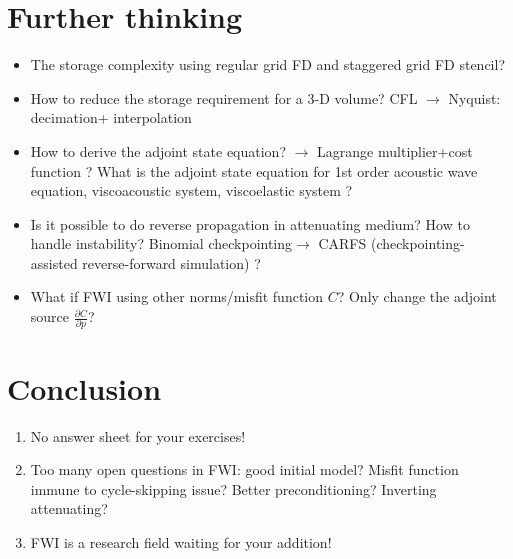 \section{Further thinking}
\begin{itemize}
 \item The storage complexity using regular grid FD and staggered grid FD stencil?
 \item How to reduce the storage requirement for a 3-D volume? CFL $\rightarrow$ Nyquist: decimation+ interpolation \citep{Yang_2016_DPI,Yang_2016_WRB}
 \item How to derive the adjoint state equation? $\rightarrow$ Lagrange multiplier+cost function \citep{Plessix_2006_RAS}? What is the adjoint state equation for 1st order acoustic wave equation, viscoacoustic system, viscoelastic system \citep{Yang_2016_SFM}?
 \item Is it possible to do reverse propagation in attenuating medium? How to handle instability? Binomial checkpointing$\rightarrow$ CARFS (checkpointing-assisted reverse-forward simulation) \citep{Yang_2016_CAR}?
 \item What if FWI using other norms/misfit function $C$? Only change the adjoint source $\frac{\partial C}{\partial p}$?
\end{itemize}

\section{Conclusion}
\begin{enumerate}
 \item No answer sheet for your exercises!
 
 \item Too many open questions in FWI: good initial model? Misfit function immune to cycle-skipping issue? Better preconditioning? Inverting attenuating?
 
 \item FWI is a research field waiting for your addition! 

\end{enumerate}


